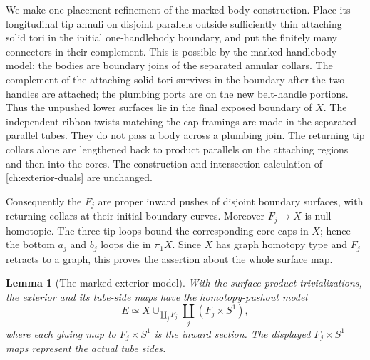 \documentclass[11pt]{article}
\newtheorem{lemma}[theorem]{Lemma}
\theoremstyle{definition}
\theoremstyle{remark}
\begin{document}
We make one placement refinement of the marked-body construction.
Place its longitudinal tip annuli on disjoint parallels outside
sufficiently thin attaching solid tori in the initial one-handlebody
boundary, and put the finitely many connectors in their complement.
This is possible by the marked handlebody model: the bodies are boundary
joins of the separated annular collars.  The complement of the attaching
solid tori survives in the boundary after the two-handles are attached;
the plumbing ports are on the new belt-handle portions.  Thus the
unpushed lower surfaces lie in the final exposed boundary of $X$.
The independent ribbon twists matching the cap framings are made in
the separated parallel tubes.  They do not pass a body across a
plumbing join.  The returning tip collars alone are lengthened back
to product parallels on the attaching regions and then into the cores.
The construction and intersection calculation of
\eqref{ch:exterior-duals} are unchanged.

Consequently the $F_j$ are proper inward pushes of disjoint boundary
surfaces, with returning collars at their initial boundary curves.
Moreover $F_j\to X$ is null-homotopic.  The three tip loops bound the
corresponding core caps in $X$; hence the bottom $a_j$ and $b_j$ loops
die in $\pi_1X$.  Since $X$ has graph homotopy type and $F_j$ retracts
to a graph, this proves the assertion about the whole surface map.

\begin{lemma}[The marked exterior model]
\label{ch:exterior-model}
With the surface-product trivializations, the exterior and its tube-side
maps have the homotopy-pushout model
\[
 E\simeq X\cup_{\coprod_jF_j}\coprod_j(F_j\times S^1),
\]
where each gluing map to $F_j\times S^1$ is the inward section.
The displayed $F_j\times S^1$ maps represent the actual tube sides.
\end{lemma}
\end{document}
